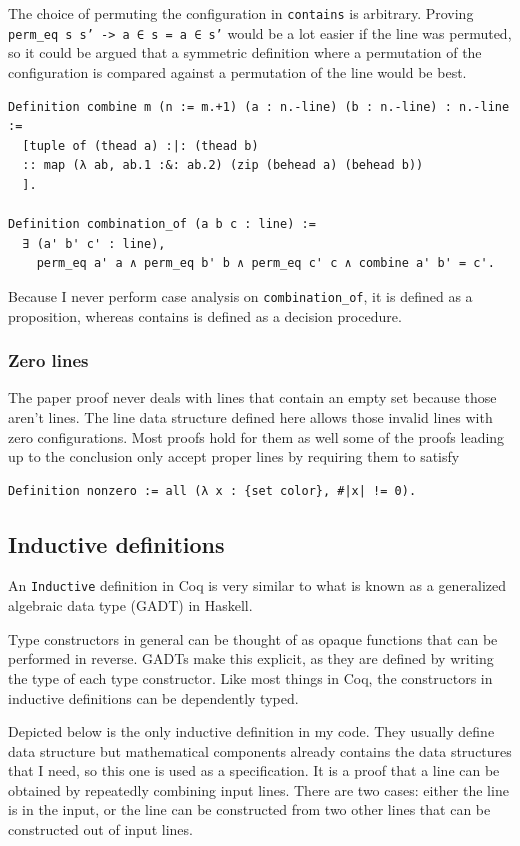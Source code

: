 \documentclass[english, 12pt, a4paper, sci, a-1b, online]{aaltothesis}
\newcommand\icoq[1]{\texttt{#1}}
\begin{document}
The choice of permuting the configuration in \icoq{contains} is arbitrary. Proving \icoq{perm_eq s s' -> a ∈ s = a ∈ s'} would be a lot easier if the line was permuted, so it could be argued that a symmetric definition where a permutation of the configuration is compared against a permutation of the line would be best.

\begin{verbatim}
Definition combine m (n := m.+1) (a : n.-line) (b : n.-line) : n.-line :=
  [tuple of (thead a) :|: (thead b)
  :: map (λ ab, ab.1 :&: ab.2) (zip (behead a) (behead b))
  ].

Definition combination_of (a b c : line) :=
  ∃ (a' b' c' : line),
    perm_eq a' a ∧ perm_eq b' b ∧ perm_eq c' c ∧ combine a' b' = c'.
\end{verbatim}

Because I never perform case analysis on \icoq{combination_of}, it is defined as a proposition, whereas contains is defined as a decision procedure.

\subsubsection{Zero lines}

The paper proof never deals with lines that contain an empty set because those aren't lines. The line data structure defined here allows those invalid lines with zero configurations. Most proofs hold for them as well some of the proofs leading up to the conclusion only accept proper lines by requiring them to satisfy
\begin{verbatim}
Definition nonzero := all (λ x : {set color}, #|x| != 0).
\end{verbatim}

\subsection{Inductive definitions}

An \icoq{Inductive} definition in Coq is very similar to what is known as a generalized algebraic data type (GADT) in Haskell.

Type constructors in general can be thought of as opaque functions that can be performed in reverse. GADTs make this explicit, as they are defined by writing the type of each type constructor. Like most things in Coq, the constructors in inductive definitions can be dependently typed.

Depicted below is the only inductive definition in my code. They usually define data structure but mathematical components already contains the data structures that I need, so this one is used as a specification. It is a proof that a line can be obtained by repeatedly combining input lines. There are two cases: either the line is in the input, or the line can be constructed from two other lines that can be constructed out of input lines.
\end{document}
